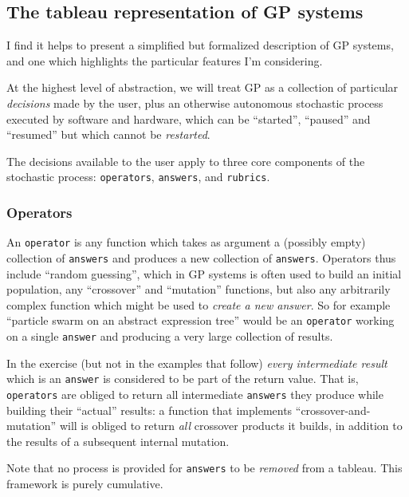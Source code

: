 \subsection{The tableau representation of GP systems}\hypertarget{the-tableau-representation-of-gp-systems}{}\label{the-tableau-representation-of-gp-systems}

I find it helps to present a simplified but formalized description of GP systems, and one which highlights the particular features I'm considering.

At the highest level of abstraction, we will treat GP as a collection of particular \emph{decisions} made by the user, plus an otherwise autonomous stochastic process executed by software and hardware, which can be ``started'', ``paused'' and ``resumed'' but which cannot be \emph{restarted}.

The decisions available to the user apply to three core components of the stochastic process: {\tt operators}, {\tt answers}, and {\tt rubrics}.

\subsubsection{Operators}\hypertarget{operators}{}\label{operators}

An {\tt operator} is any function which takes as argument a (possibly empty) collection of {\tt answers} and produces a new collection of {\tt answers}. Operators thus include ``random guessing'', which in GP systems is often used to build an initial population, any ``crossover'' and ``mutation'' functions, but also any arbitrarily complex function which might be used to \emph{create a new answer}. So for example ``particle swarm on an abstract expression tree'' would be an {\tt operator} working on a single {\tt answer} and producing a very large collection of results.

In the exercise (but not in the examples that follow) \emph{every intermediate result} which is an {\tt answer} is considered to be part of the return value. That is, {\tt operators} are obliged to return all intermediate {\tt answers} they produce while building their ``actual'' results: a function that implements ``crossover-and-mutation'' will is obliged to return \emph{all} crossover products it builds, in addition to the results of a subsequent internal mutation.

Note that no process is provided for {\tt answers} to be \emph{removed} from a tableau. This framework is purely cumulative.


